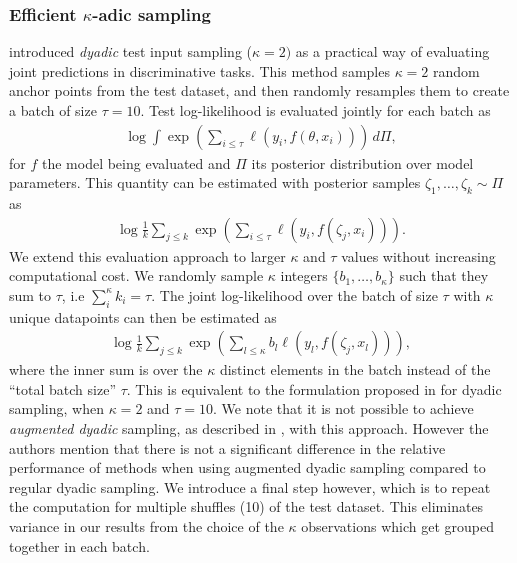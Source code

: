 \subsubsection{Efficient $\kappa$-adic sampling}
\textcite{osband2022evaluating,Osband2021epistemic} introduced \textit{dyadic} test input sampling ($\kappa = 2)$ as a practical way of evaluating joint predictions in discriminative tasks. This method samples $\kappa=2$ random anchor points from the test dataset, and then randomly resamples them to create a batch of size $\tau=10$. Test log-likelihood is evaluated jointly for each batch as
\begin{gather*}
   \log  \int \exp\left(\sum_{i \leq \tau}\ell(y_{i}, f(\theta, x_{i})) \right) \, d\Pi,
\end{gather*}
for $f$ the model being evaluated and $\Pi$ its posterior distribution over model parameters. This quantity can be estimated with posterior samples $\zeta_{1}, \dotsc, \zeta_{k} \sim \Pi$ as
\begin{gather*}
   \log  \frac{1}{k} \sum_{j \leq k} \exp\left(\sum_{i \leq \tau}\ell(y_{i}, f(\zeta_{j}, x_{i})) \right).
\end{gather*}
We extend this evaluation approach to larger $\kappa$ and $\tau$ values without increasing computational cost. 
We randomly sample $\kappa$ integers $\{b_1, \ldots, b_{\kappa}\}$ such that they sum to $\tau$, i.e $\sum_i^{\kappa} k_i = \tau$. The joint log-likelihood over the batch of size $\tau$ with $\kappa$ unique datapoints can then be estimated as 
\begin{gather*}
    \log  \frac{1}{k} \sum_{j \leq k} \exp\left(\sum_{l \leq \kappa} b_{l} \ell(y_{l}, f(\zeta_{j}, x_{l})) \right),
\end{gather*}
where the inner sum is over the $\kappa$ distinct elements in the batch instead of the ``total batch size'' $\tau$.
This is equivalent to the formulation proposed in \textcite{osband2022evaluating} for dyadic sampling, when $\kappa=2$ and $\tau = 10$. We note that it is not possible to achieve \textit{augmented dyadic} sampling, as described in \textcite{Osband2021epistemic}, with this approach. However the authors mention that there is not a significant difference in the relative performance of methods when using augmented dyadic sampling compared to regular dyadic sampling. We introduce a final step however, which is to repeat the computation for multiple shuffles (10) of the test dataset. This eliminates variance in our results from the choice of the $\kappa$ observations which get grouped together in each batch. 


